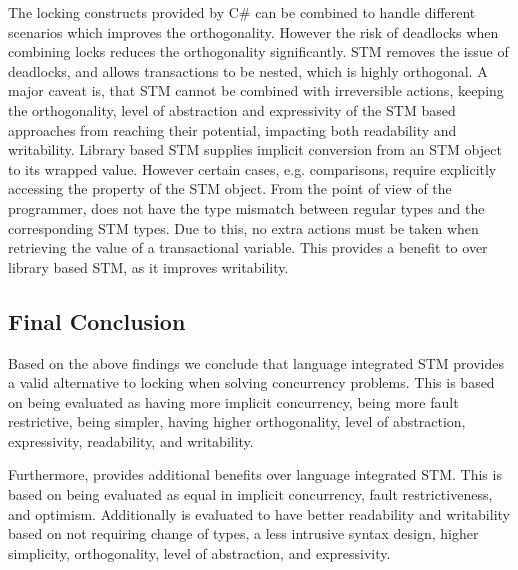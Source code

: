 The locking constructs provided by C\#  can be  combined to handle different scenarios which improves the orthogonality. However the risk of deadlocks when combining locks reduces the orthogonality significantly. \ac{STM} removes the issue of deadlocks, and allows transactions to be nested, which is highly orthogonal. A major caveat is, that \ac{STM} cannot be combined with irreversible actions, keeping the orthogonality, level of abstraction and expressivity of the \ac{STM} based approaches from reaching their potential, impacting both readability and writability. Library based \ac{STM} supplies implicit conversion from an \ac{STM} object to its wrapped value. However certain cases,  e.g. comparisons, require explicitly accessing the  property of the \ac{STM} object. From the point of view of the programmer, \stmname does not have the type mismatch between regular types and the corresponding \ac{STM} types. Due to this, no extra actions must be taken when retrieving the value of a transactional variable. This provides a benefit to \stmname over library based \ac{STM}, as it improves writability.

\subsection{Final Conclusion}
Based on the above findings we conclude that language integrated \ac{STM} provides a valid alternative to locking when solving concurrency problems. This is based on being evaluated as having more implicit concurrency, being more fault restrictive, being simpler, having higher orthogonality, level of abstraction, expressivity, readability, and writability.

Furthermore, \stmname provides additional benefits over language integrated \ac{STM}. This is based on being evaluated as equal in implicit concurrency, fault restrictiveness, and optimism. Additionally \stmname is evaluated to have better readability and writability based on not requiring change of types, a less intrusive syntax design, higher simplicity, orthogonality, level of abstraction, and expressivity.

\worksheetend